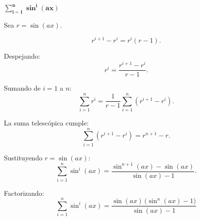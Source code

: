 $\displaystyle \mathbf{\sum_{i=1}^{n} \sin^{i}(ax)}$
\nopagebreak

Sea \(r=\sin(ax)\).

\[
r^{i+1}-r^{i}=r^{i}(r-1).
\]

Despejando:
\[
r^{i}=\frac{r^{i+1}-r^{i}}{r-1}.
\]

Sumando de \(i=1\) a \(n\):
\[
\sum_{i=1}^{n} r^{i}
=
\frac{1}{r-1}\sum_{i=1}^{n}(r^{i+1}-r^{i}).
\]

La suma telescópica cumple:
\[
\sum_{i=1}^{n}(r^{i+1}-r^{i})
= r^{n+1}-r.
\]

Sustituyendo \(r=\sin(ax)\):
\[
\sum_{i=1}^{n} \sin^{i}(ax)
=
\frac{\sin^{n+1}(ax)-\sin(ax)}{\sin(ax)-1}.
\]

Factorizando:
\[
\boxed{
\sum_{i=1}^{n} \sin^{i}(ax)
=
\frac{\sin(ax)\,\big(\sin^{n}(ax)-1\big)}{\sin(ax)-1}
}
\]
